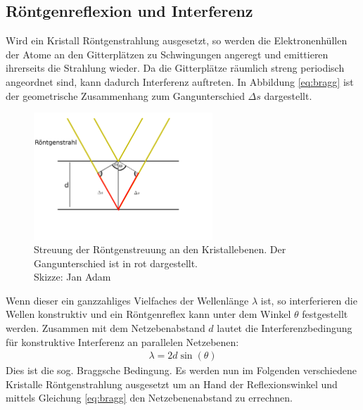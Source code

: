 \subsection{Röntgenreflexion und Interferenz}
Wird ein Kristall Röntgenstrahlung ausgesetzt, so werden die Elektronenhüllen der Atome an den Gitterplätzen zu Schwingungen angeregt und emittieren ihrerseits die Strahlung wieder. Da die Gitterplätze räumlich streng periodisch angeordnet sind, kann dadurch Interferenz auftreten. In Abbildung \ref{eq:bragg} ist der geometrische Zusammenhang zum Gangunterschied $\Delta s$ dargestellt.
\begin{figure}[htbp]
	\includegraphics[width=0.6\textwidth]{../pics/bragg.png}
	\caption{Streuung der Röntgenstreuung an den Kristallebenen. Der Gangunterschied ist in rot dargestellt.\\
		Skizze: Jan Adam}
	\label{pic:bragg}
\end{figure}
Wenn dieser ein ganzzahliges Vielfaches der Wellenlänge $\lambda$ ist, so interferieren die Wellen konstruktiv und ein Röntgenreflex kann unter dem Winkel $\theta$ festgestellt werden. Zusammen mit dem Netzebenabstand $d$ lautet die Interferenzbedingung für konstruktive Interferenz an parallelen Netzebenen:
\begin{align}
 \lambda = 2 d \sin(\theta)
 \label{eq:bragg}
\end{align}
Dies ist die sog. Braggsche Bedingung. Es werden nun im Folgenden verschiedene Kristalle Röntgenstrahlung ausgesetzt um an Hand der Reflexionswinkel und mittels Gleichung \ref{eq:bragg} den Netzebenenabstand zu errechnen.

